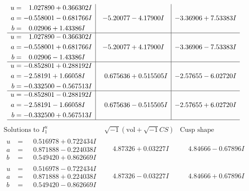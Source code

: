 \documentclass[1p]{elsarticle_modified}
\theoremstyle{definition}
\newcommand{\I}{\sqrt{-1}}
\begin{document}
$$\begin{array}{c|c|c}
\begin{aligned}
u &= \phantom{-}1.027890 + 0.366302 I \\
a &= -0.558001 - 0.681766 I \\
b &= \phantom{-}0.02906 + 1.43386 I\end{aligned}
 & -5.20077 - 4.17900 I & -3.36906 + 7.53383 I \\ \hline\begin{aligned}
u &= \phantom{-}1.027890 - 0.366302 I \\
a &= -0.558001 + 0.681766 I \\
b &= \phantom{-}0.02906 - 1.43386 I\end{aligned}
 & -5.20077 + 4.17900 I & -3.36906 - 7.53383 I \\ \hline\begin{aligned}
u &= -0.852801 + 0.288192 I \\
a &= -2.58191 + 1.66058 I \\
b &= -0.332500 - 0.567513 I\end{aligned}
 & \phantom{-}0.675636 + 0.515505 I & -2.57655 - 6.02720 I \\ \hline\begin{aligned}
u &= -0.852801 - 0.288192 I \\
a &= -2.58191 - 1.66058 I \\
b &= -0.332500 + 0.567513 I\end{aligned}
 & \phantom{-}0.675636 - 0.515505 I & -2.57655 + 6.02720 I\\
 \hline 
 \end{array}$$\newpage$$\begin{array}{c|c|c}  
\text{Solutions to }I^u_{1}& \I (\text{vol} + \sqrt{-1}CS) & \text{Cusp shape}\\
 \hline 
\begin{aligned}
u &= \phantom{-}0.516978 + 0.722434 I \\
a &= \phantom{-}0.871888 - 0.224038 I \\
b &= \phantom{-}0.549420 + 0.862669 I\end{aligned}
 & \phantom{-}4.87326 + 0.03227 I & \phantom{-}4.84666 - 0.67896 I \\ \hline\begin{aligned}
u &= \phantom{-}0.516978 - 0.722434 I \\
a &= \phantom{-}0.871888 + 0.224038 I \\
b &= \phantom{-}0.549420 - 0.862669 I\end{aligned}
 & \phantom{-}4.87326 - 0.03227 I & \phantom{-}4.84666 + 0.67896 I \\ \hline\begin{aligned}

\end{aligned}
\end{array}$$
\end{document}

